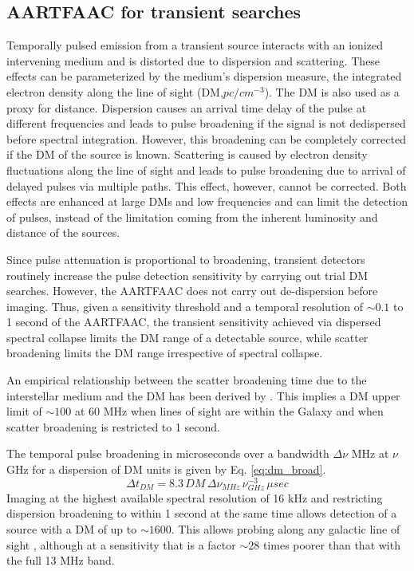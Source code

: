 \documentclass{aa}
\begin{document}
\subsection{\label{sub:AARTFAAC-for-Transient}AARTFAAC for transient searches}

Temporally pulsed  emission from  a transient source  interacts with  an ionized
intervening medium  and is  distorted due to  dispersion and  scattering. These
effects can be parameterized by  the medium's dispersion measure, the integrated
electron density along the line of  sight (DM,$pc/cm^{-3}$). The DM is also used
as a proxy for distance. Dispersion causes an arrival time delay of the pulse at
different  frequencies and  leads  to pulse  broadening  if the  signal is  not
dedispersed  before  spectral  integration.  However,  this  broadening  can  be
completely corrected if  the DM of the source is known.  Scattering is caused by
electron  density  fluctuations along  the  line of  sight  and leads to  pulse
broadening due  to arrival  of delayed pulses  via multiple paths.  This effect,
however, cannot  be corrected. Both  effects are enhanced  at large DMs  and low
frequencies and  can limit the detection  of pulses, instead  of the limitation
coming from the inherent luminosity and distance of the sources.

Since  pulse  attenuation is  proportional  to  broadening, transient  detectors
routinely  increase the  pulse detection  sensitivity by  carrying out  trial DM
searches.   However,  the  AARTFAAC  does  not carry  out  de-dispersion  before
imaging.   Thus, given  a sensitivity  threshold  and a  temporal resolution  of
$\sim$$0.1$ to  1 second of the  AARTFAAC, the transient  sensitivity achieved via
dispersed spectral  collapse limits the DM  range of a  detectable source, while
scatter broadening limits the DM range irrespective of spectral collapse.

An  empirical  relationship between  the  scatter  broadening  time due  to  the
interstellar     medium     and    the     DM     has     been    derived     by
\citet{bhat2004multifrequency}. This implies a DM upper limit of $\sim$$100$ at 60
MHz when  lines of sight  are within the  Galaxy and when scatter  broadening is
restricted to 1 second.

The temporal pulse  broadening in microseconds over a  bandwidth $\Delta\nu$ MHz
at $\nu$ GHz for a dispersion of DM units is given by Eq. \ref{eq:dm_broad}.
\begin{equation}
\Delta t_{DM}=8.3\,DM\,\Delta\nu_{MHz}\,\nu_{GHz}^{-3}\, \mu sec\label{eq:dm_broad}
\end{equation}
Imaging at the  highest available spectral resolution of  16 kHz and restricting
dispersion broadening to within 1 second  at the same time allows detection of a
source with  a DM of up to  $\sim$$1600$.  This allows probing  along any galactic
line of sight \citep{cordes2002ne2001}, although  at a sensitivity that is a factor  $\sim$$28$ times poorer than that with the full 13 MHz band.
\end{document}
